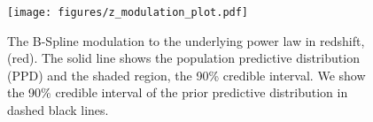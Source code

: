 \begin{figure}[h]
    \texttt{[image: figures/z\_modulation\_plot.pdf]}
    \caption{The B-Spline modulation to the underlying power law in redshift, (red). The solid line shows the population predictive distribution (PPD) 
    and the shaded region, the 90\% credible interval. We show the 90\% credible interval of the prior predictive distribution in dashed black lines.}
    \label{fig:z_modulation}
\end{figure}